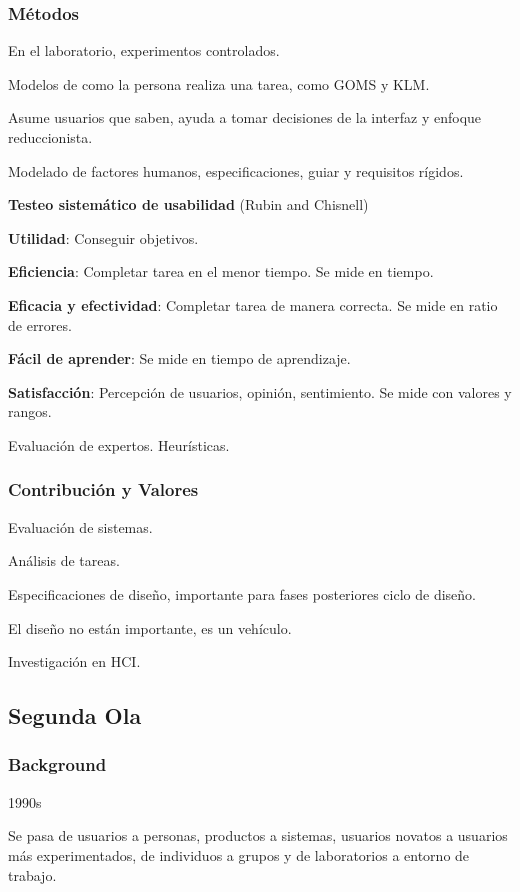 \documentclass[12pt, twoside, openright]{report} %
\begin{document}
\subsubsection{Métodos}

En el laboratorio, experimentos controlados.

Modelos de como la persona realiza una tarea, como GOMS y KLM.

Asume usuarios que saben, ayuda a tomar decisiones de la interfaz y
enfoque reduccionista.

Modelado de factores humanos, especificaciones, guiar y requisitos
rígidos.

\textbf{Testeo sistemático de usabilidad} (Rubin and Chisnell)

\textbf{Utilidad}: Conseguir objetivos.

\textbf{Eficiencia}: Completar tarea en el menor tiempo. Se mide en
tiempo.

\textbf{Eficacia y efectividad}: Completar tarea de manera correcta. Se
mide en ratio de errores.

\textbf{Fácil de aprender}: Se mide en tiempo de aprendizaje.

\textbf{Satisfacción}: Percepción de usuarios, opinión, sentimiento. Se
mide con valores y rangos.

Evaluación de expertos. Heurísticas.

\subsubsection{Contribución y Valores}

Evaluación de sistemas.

Análisis de tareas.

Especificaciones de diseño, importante para fases posteriores ciclo de
diseño.

El diseño no están importante, es un vehículo.

Investigación en HCI.

\subsection{Segunda Ola}

\subsubsection{Background}

1990s

Se pasa de usuarios a personas, productos a sistemas, usuarios novatos a
usuarios más experimentados, de individuos a grupos y de laboratorios a
entorno de trabajo.
\end{document}
